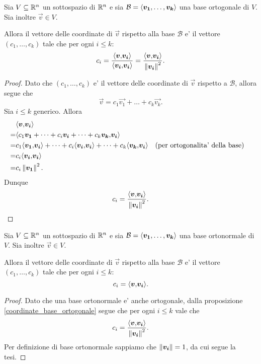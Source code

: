 \begin{proposition}
    \label{coordinate_base_ortogonale}
    Sia $V \subseteq \mathbb{R}^n$ un sottospazio di $\mathbb{R}^n$ e sia $\mathcal{B} = \left\langle \bm{v_1}, \dots, \bm{v_k} \right\rangle$ una base ortogonale di $V$. Sia inoltre $\vec v \in V$.

    Allora il vettore delle coordinate di $\vec v$ rispetto alla base $\mathcal{B}$ e' il vettore $(c_1, \dots, c_k)$ tale che per ogni $i \leq k$:
    \[
        c_i = \frac{\langle \bm{v}{,}\bm{v_i}\rangle}{\langle \bm{v_i}{,}\bm{v_i}\rangle} = \frac{\langle \bm{v}{,}\bm{v_i}\rangle}{\left\lVert\bm{v_i}\right\rVert^2}.    
    \]
\end{proposition}
\begin{proof}
    Dato che $(c_1, \dots, c_k)$ e' il vettore delle coordinate di $\vec v$ rispetto a $\mathcal{B}$, allora segue che \[
        \vec v = c_1\vec{v_1} + \dots + c_k\vec{v_k}.   
    \] Sia $i \leq k$ generico. Allora
    \begin{align*}
        &\langle \bm{v}{,}\bm{v_i}\rangle \\
        = &\langle c_1\bm{v_1} + \dots + c_i\bm{v_i} + \dots + c_k\bm{v_k}{,}\bm{v_i}\rangle\\
        = &c_1\langle \bm{v_1}{,}\bm{v_i}\rangle + \dots + c_i\langle \bm{v_i}{,}\bm{v_i}\rangle + \dots + c_k\langle \bm{v_k}{,}\bm{v_i}\rangle &&\text{(per ortogonalita' della base)}\\
        = &c_i\langle \bm{v_i}{,}\bm{v_i}\rangle\\
        = &c_i\left\lVert\bm{v_1}\right\rVert^2.
    \end{align*}
    Dunque \[
        c_i = \frac{\langle \bm{v}{,}\bm{v_i}\rangle}{\left\lVert\bm{v_i}\right\rVert^2}. \qedhere
    \]
\end{proof}
\begin{corollary}
    \label{coordinate_base_ortonormale}
    Sia $V \subseteq \mathbb{R}^n$ un sottospazio di $\mathbb{R}^n$ e sia $\mathcal{B} = \left\langle \bm{v_1}, \dots, \bm{v_k} \right\rangle$ una base ortonormale di $V$. Sia inoltre $\vec v \in V$.

    Allora il vettore delle coordinate di $\vec v$ rispetto alla base $\mathcal{B}$ e' il vettore $(c_1, \dots, c_k)$ tale che per ogni $i \leq k$:
    \[
        c_i = \langle \bm{v}{,}\bm{v_i}\rangle.    
    \]
\end{corollary}
\begin{proof}
    Dato che una base ortonormale e' anche ortogonale, dalla proposizione \ref{coordinate_base_ortogonale} segue che per ogni $i \leq k$ vale che \[
        c_i = \frac{\langle \bm{v}{,}\bm{v_i}\rangle}{\left\lVert\bm{v_i}\right\rVert^2}.
    \] Per definizione di base ortonormale sappiamo che $\left\lVert\bm{v_i}\right\rVert = 1$, da cui segue la tesi.
\end{proof}


